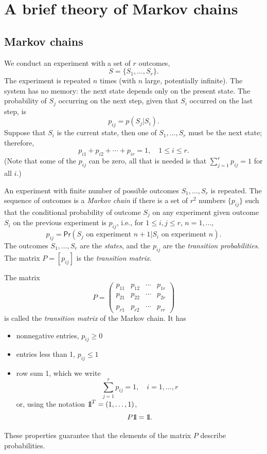 \chapter{A brief theory of Markov chains}
\label{chap:markov}

\section{Markov chains}
We conduct an experiment with a set of $r$ outcomes,
\[
S=\{S_1,\dots, S_r\}.
\]
The experiment is repeated $n$ times (with $n$ large, potentially infinite). 
The system has no memory: the next state depends only on the present state. 
The probability of $S_j$ occurring on the next step, given that $S_i$ occurred on the last step, is
\[
p_{ij}=p(S_j|S_i).
\]
Suppose that $S_i$ is the current state, then one of $S_1, \ldots,S_r$ must be the next state; therefore,
\[
p_{i1}+p_{i2}+\cdots+p_{ir}=1, \quad 1\leq i\leq r.
\]
(Note that some of the $p_{ij}$ can be zero, all that is needed is that $\sum_{j=1}^r p_{ij}=1$ for all $i$.)

\begin{definition}
An experiment with finite number of possible outcomes $S_1,\ldots,S_r$ is repeated. The sequence of outcomes is a \emph{Markov chain} if there is a set of $r^2$ numbers $\{p_{ij}\}$ such that the conditional probability of outcome $S_j$ on any experiment given outcome $S_i$ on the previous experiment is $p_{ij}$, i.e., for $1\leq i,j\leq r$, $n=1,\ldots$,
\[
p_{ij}=\mathsf{Pr}(S_j\textrm{ on experiment }n+1|S_i\textrm{ on experiment }n).
\]
The outcomes $S_1,\ldots,S_r$ are the \emph{states}, and the $p_{ij}$ are the \emph{transition probabilities}. The matrix $P=[p_{ij}]$ is the \emph{transition matrix}.
\end{definition}
The matrix 
\[
P=
\begin{pmatrix}
p_{11} & p_{12} & \cdots & p_{1r} \\
p_{21} & p_{22} & \cdots & p_{2r} \\
&&& \\
p_{r1} & p_{r2} & \cdots & p_{rr}
\end{pmatrix}
\]
is called the \emph{transition matrix} of the Markov chain. It has
\begin{itemize}
\item nonnegative entries, $p_{ij}\geq 0$
\item entries less than 1, $p_{ij}\leq 1$
\item row sum 1, which we write
\[
\sum_{j=1}^r p_{ij}=1,\quad i=1,\ldots,r
\]
or, using the notation $\nbOne^T=(1,\ldots,1)$,
\[
P\nbOne=\nbOne.
\]
\end{itemize}
These properties guarantee that the elements of the matrix $P$ describe probabilities.


